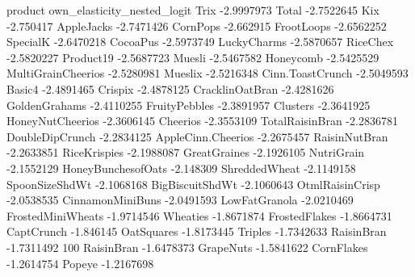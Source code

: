 product	own_elasticity_nested_logit
Trix	-2.9997973
Total	-2.7522645
Kix	-2.750417
AppleJacks	-2.7471426
CornPops	-2.662915
FrootLoops	-2.6562252
SpecialK	-2.6470218
CocoaPus	-2.5973749
LuckyCharms	-2.5870657
RiceChex	-2.5820227
Product19	-2.5687723
Muesli	-2.5467582
Honeycomb	-2.5425529
MultiGrainCheerios	-2.5280981
Mueslix	-2.5216348
Cinn.ToastCrunch	-2.5049593
Basic4	-2.4891465
Crispix	-2.4878125
CracklinOatBran	-2.4281626
GoldenGrahams	-2.4110255
FruityPebbles	-2.3891957
Clusters	-2.3641925
HoneyNutCheerios	-2.3606145
Cheerios	-2.3553109
TotalRaisinBran	-2.2836781
DoubleDipCrunch	-2.2834125
AppleCinn.Cheerios	-2.2675457
RaisinNutBran	-2.2633851
RiceKrispies	-2.1988087
GreatGraines	-2.1926105
NutriGrain	-2.1552129
HoneyBunchesofOats	-2.148309
ShreddedWheat	-2.1149158
SpoonSizeShdWt	-2.1068168
BigBiscuitShdWt	-2.1060643
OtmlRaisinCrisp	-2.0538535
CinnamonMiniBuns	-2.0491593
LowFatGranola	-2.0210469
FrostedMiniWheats	-1.9714546
Wheaties	-1.8671874
FrostedFlakes	-1.8664731
CaptCrunch	-1.846145
OatSquares	-1.8173445
Triples	-1.7342633
RaisinBran	-1.7311492
100%
RaisinBran	-1.6478373
GrapeNuts	-1.5841622
CornFlakes	-1.2614754
Popeye	-1.2167698
